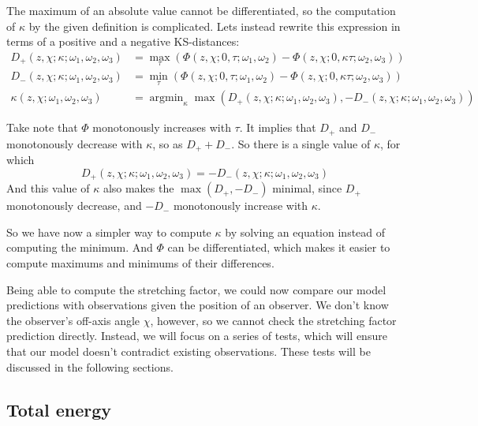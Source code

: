 \documentclass{article}
\DeclareMathOperator*{\argmin}{argmin}
\begin{document}
The maximum of an absolute value cannot be differentiated, so the computation of $\kappa$ by the given definition is complicated. Lets instead rewrite this expression in terms of a positive and a negative KS-distances:
\begin{align*}
D_+\left(z,\chi; \kappa; \omega_1, \omega_2, \omega_3\right) &= \max_\tau\left( \Phi\left(z,\chi; 0,\tau; \omega_1,\omega_2\right) - \Phi\left( z,\chi; 0,\kappa \tau; \omega_2,\omega_3 \right) \right) \\
D_-\left(z,\chi; \kappa; \omega_1, \omega_2, \omega_3\right) &= \min_\tau\left( \Phi\left(z,\chi; 0,\tau; \omega_1,\omega_2\right) - \Phi\left( z,\chi; 0,\kappa \tau; \omega_2,\omega_3 \right) \right) \\
\kappa\left(z,\chi; \omega_1, \omega_2, \omega_3\right) &= \argmin_\kappa \max\left(D_+\left(z,\chi; \kappa; \omega_1, \omega_2, \omega_3\right), -D_-\left(z,\chi; \kappa; \omega_1, \omega_2, \omega_3\right)\right)
\end{align*}

Take note that $\Phi$ monotonously increases with $\tau$. It implies that $D_+$ and $D_-$ monotonously decrease with $\kappa$, so as $D_+ + D_-$. So there is a single value of $\kappa$, for which
\begin{equation}
D_+\left(z,\chi; \kappa; \omega_1, \omega_2, \omega_3\right) = -D_-\left(z,\chi; \kappa; \omega_1, \omega_2, \omega_3\right)
\end{equation}
And this value of $\kappa$ also makes the $\max\left({D_+, -D_-}\right)$ minimal, since $D_+$ monotonously decrease, and $-D_-$ monotonously increase with $\kappa$.

So we have now a simpler way to compute $\kappa$ by solving an equation instead of computing the minimum. And $\Phi$ can be differentiated, which makes it easier to compute maximums and minimums of their differences.

Being able to compute the stretching factor, we could now compare our model predictions with observations given the position of an observer. We don't know the observer's off-axis angle $\chi$, however, so we cannot check the stretching factor prediction directly. Instead, we will focus on a series of tests, which will ensure that our model doesn't contradict existing observations. These tests will be discussed in the following sections.

\subsection{Total energy}
\end{document}
